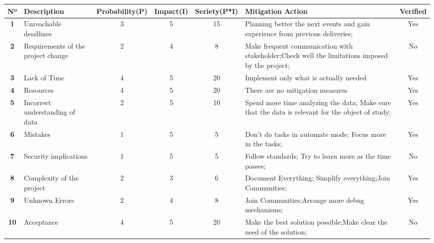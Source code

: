 \begin{longtable}{|c|p{3cm}|c|c|c|p{3cm}|c|} 
	
	\hline
	\textbf{Nº} & 
	\textbf{Description} & 
	\textbf{Probability(P)} & 
	\textbf{Impact(I)} & 
	\textbf{Seriety(P*I)} & 
	\textbf{Mitigation Action} & 
	\textbf{Verified}  
	\\ \hline
	\endfirsthead
	
	\hline
	\textbf{1} 
	& 
	Unreachable deadlines
	& 3 
	& 5 
	& 15 
	& Planning better the next events and gain experience from previous deliveries;
	& Yes 
	\\ \hline
	
	\textbf{2} 
	& 
	Requirements of the project change
	& 2 
	& 4 
	& 8 
	& Make frequent communication with stakeholder;Check well the limitations imposed by the project;
	& No
	\\ \hline
	
	\textbf{3} 
	& 
	Lack of Time
	& 4 
	& 5 
	& 20 
	& Implement only what is actually needed
	& Yes
	\\ \hline
	
	\textbf{4} 
	& 
	Resources
	& 4 
	& 5 
	& 20 
	& There are no mitigation measures
	& Yes
	\\ \hline
	
	\textbf{5} 
	& 
	Incorrect understanding of data
	& 2 
	& 5 
	& 10 
	& Spend more time analyzing the data; Make sure that the data is relevant for the object of study;
	& Yes
	\\ \hline
	
	\textbf{6} 
	& 
	Mistakes
	& 1 
	& 5 
	& 5 
	& Don't do tasks in automate mode; Focus more in the tasks;
	& Yes
	\\ \hline
	
	\textbf{7} 
	& 
	Security implications
	& 1 
	& 5 
	& 5 
	& Follow standards; Try to learn more as the time passes;
	& No
	\\ \hline
	
	\textbf{8} 
	& 
	Complexity of the project
	& 2 
	& 3 
	& 6 
	& Document Everything; Simplify everything;Join Communities;
	& Yes
	\\ \hline
	
	\textbf{9} 
	& 
	Unknown Errors
	& 2 
	& 4 
	& 8 
	& Join Communities;Arrange more debug mechanisms;
	& Yes
	\\ \hline
	
	\textbf{10} 
	& 
	Acceptance
	& 4 
	& 5 
	& 20
	& Make the best solution possible;Make clear the need of the solution;
	& No
	\\ \hline
	

\end{longtable}
